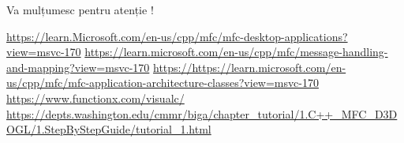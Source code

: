 \documentclass{amsart}
\begin{document}
\centerline{Va mulțumesc pentru atenție !}   

\hfill \newline
\hfill \newline
\hfill \newline


\begin{thebibliography}{99}
 \url{https://learn.Microsoft.com/en-us/cpp/mfc/mfc-desktop-applications?view=msvc-170}
 \url{https://learn.microsoft.com/en-us/cpp/mfc/message-handling-and-mapping?view=msvc-170}
 \url{https://https://learn.microsoft.com/en-us/cpp/mfc/mfc-application-architecture-classes?view=msvc-170}
 \url{https://www.functionx.com/visualc/}
 \url{https://depts.washington.edu/cmmr/biga/chapter_tutorial/1.C++_MFC_D3DOGL/1.StepByStepGuide/tutorial_1.html}
\end{thebibliography}
\end{document}
